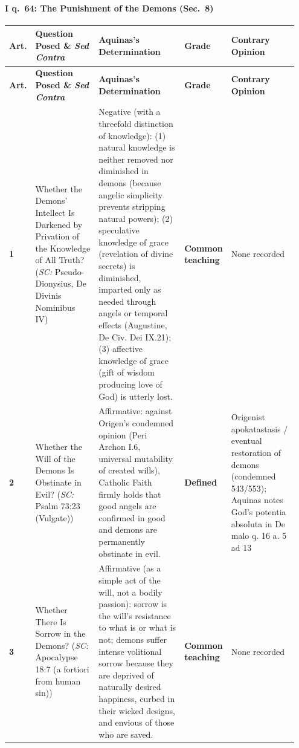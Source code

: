 \paragraph{I q.~64: The Punishment of the Demons (Sec.~8)}
{\scriptsize
\setlength{\tabcolsep}{2.5pt}
\renewcommand{\arraystretch}{1.15}
\begin{longtable}{>{\raggedright\arraybackslash}p{0.05\linewidth}>{\raggedright\arraybackslash}p{0.23\linewidth}>{\raggedright\arraybackslash}p{0.31\linewidth}>{\raggedright\arraybackslash}p{0.12\linewidth}>{\raggedright\arraybackslash}p{0.24\linewidth}}
\toprule
\textbf{Art.} & \textbf{Question Posed \& \emph{Sed Contra}} & \textbf{Aquinas's Determination} & \textbf{Grade} & \textbf{Contrary Opinion} \\
\midrule
\endfirsthead
\toprule
\textbf{Art.} & \textbf{Question Posed \& \emph{Sed Contra}} & \textbf{Aquinas's Determination} & \textbf{Grade} & \textbf{Contrary Opinion} \\
\midrule
\endhead
\bottomrule
\endfoot
\textbf{1} & Whether the Demons' Intellect Is Darkened by Privation of the Knowledge of All Truth? (\emph{SC:} Pseudo-Dionysius, De Divinis Nominibus IV) & Negative (with a threefold distinction of knowledge): (1) natural knowledge is neither removed nor diminished in demons (because angelic simplicity prevents stripping natural powers); (2) speculative knowledge of grace (revelation of divine secrets) is diminished, imparted only as needed through angels or temporal effects (Augustine, De Civ. Dei IX.21); (3) affective knowledge of grace (gift of wisdom producing love of God) is utterly lost. & \textbf{Common teaching} & None recorded \\
\addlinespace[1.5pt]
\textbf{2} & Whether the Will of the Demons Is Obstinate in Evil? (\emph{SC:} Psalm 73:23 (Vulgate)) & Affirmative: against Origen's condemned opinion (Peri Archon I.6, universal mutability of created wills), Catholic Faith firmly holds that good angels are confirmed in good and demons are permanently obstinate in evil. & \textbf{Defined} & Origenist apokatastasis / eventual restoration of demons (condemned 543/553); Aquinas notes God's potentia absoluta in De malo q. 16 a. 5 ad 13 \\
\addlinespace[1.5pt]
\textbf{3} & Whether There Is Sorrow in the Demons? (\emph{SC:} Apocalypse 18:7 (a fortiori from human sin)) & Affirmative (as a simple act of the will, not a bodily passion): sorrow is the will's resistance to what is or what is not; demons suffer intense volitional sorrow because they are deprived of naturally desired happiness, curbed in their wicked designs, and envious of those who are saved. & \textbf{Common teaching} & None recorded \\

\end{longtable}}
